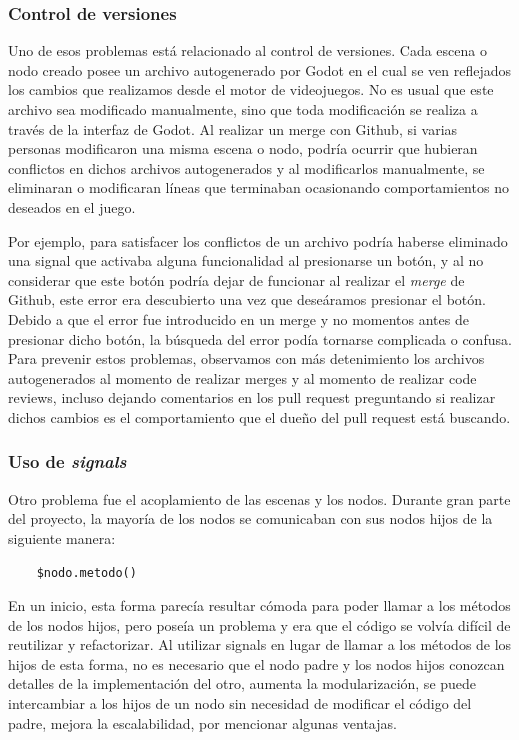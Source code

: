 \subsubsection{Control de versiones}

\noindent Uno de esos problemas está relacionado al control de versiones. Cada escena o nodo creado posee 
un archivo autogenerado por Godot en el cual se ven reflejados los cambios que realizamos desde 
el motor de videojuegos. No es usual que este archivo sea modificado manualmente, sino que toda 
modificación se realiza a través de la interfaz de Godot. Al realizar un merge con Github, si 
varias personas modificaron una misma escena o nodo, podría ocurrir que hubieran conflictos en 
dichos archivos autogenerados y al modificarlos manualmente, se eliminaran o modificaran líneas 
que terminaban ocasionando comportamientos no deseados en el juego.

Por ejemplo, para satisfacer los conflictos de un archivo podría haberse eliminado una signal 
que activaba alguna funcionalidad al presionarse un botón, y al no considerar que este botón 
podría dejar de funcionar al realizar el \textit{merge} de Github, este error era descubierto una 
vez que deseáramos presionar el botón. Debido a que el error fue introducido en un merge y 
no momentos antes de presionar dicho botón, la búsqueda del error podía tornarse complicada 
o confusa. Para prevenir estos problemas, observamos con más detenimiento los archivos 
autogenerados al momento de realizar merges y al momento de realizar code reviews, 
incluso dejando comentarios en los pull request preguntando si realizar dichos cambios 
es el comportamiento que el dueño del pull request está buscando.

\subsubsection{Uso de \textit{signals}}

\noindent Otro problema fue el acoplamiento de las escenas y los nodos. Durante gran parte del proyecto, 
la mayoría de los nodos se comunicaban con sus nodos hijos de la siguiente manera:

\begin{lstlisting}
    $nodo.metodo()
\end{lstlisting}

En un inicio, esta forma parecía resultar cómoda para poder llamar a los métodos de los nodos 
hijos, pero poseía un problema y era que el código se volvía difícil de reutilizar y refactorizar. 
Al utilizar signals en lugar de llamar a los métodos de los hijos de esta forma, no es necesario 
que el nodo padre y los nodos hijos conozcan detalles de la implementación del otro, aumenta 
la modularización, se puede intercambiar a los hijos de un nodo sin necesidad de modificar el 
código del padre, mejora la escalabilidad, por mencionar algunas ventajas.

